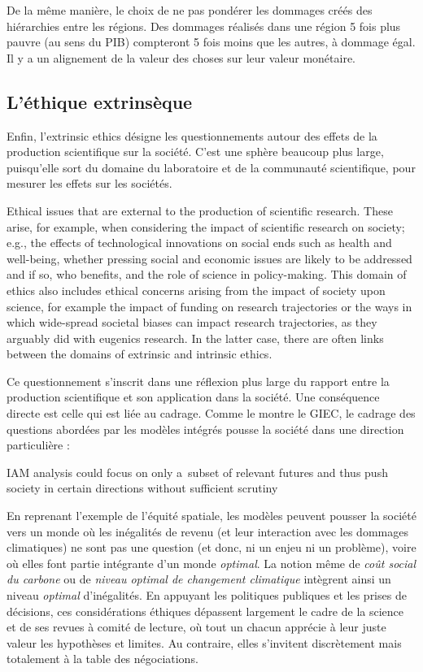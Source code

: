 De la même manière, le choix de ne pas pondérer les dommages créés des hiérarchies entre les régions. Des dommages réalisés dans une région 5 fois plus pauvre (au sens du PIB) compteront 5 fois moins que les autres, à dommage égal. Il y a un alignement de la valeur des choses sur leur valeur monétaire. 


\subsection{L'éthique extrinsèque}

Enfin, l'\Gls{extrinsic ethics} désigne les questionnements autour des effets de la production scientifique sur la société. C'est une sphère beaucoup plus large, puisqu'elle sort du domaine du laboratoire et de la communauté scientifique, pour mesurer les effets sur les sociétés. 

\begin{displayquote}
Ethical issues that are external to the production of scientific research. These arise, for example, when considering the impact of scientific research on society; e.g., the effects of technological innovations on social ends such as health and well-being, whether pressing social and economic issues are likely to be addressed and if so, who benefits, and the role of science in policy-making. This domain of ethics also includes ethical concerns arising from the impact of society upon science, for example the impact of funding on research trajectories or the ways in which wide-spread societal biases can impact research trajectories, as they arguably did with eugenics research. In the latter case, there are often links between the domains of extrinsic and intrinsic ethics.
\end{displayquote}
Ce questionnement s'inscrit dans une réflexion plus large du rapport entre la production scientifique et son application dans la société.  Une conséquence directe est celle qui est liée au cadrage. Comme le montre le GIEC, le cadrage des questions abordées par les modèles intégrés pousse la société dans une direction particulière : 

\begin{displayquote}
     IAM analysis could focus on only a subset of relevant futures and thus push society in certain directions without sufficient scrutiny 
\end{displayquote}
En reprenant l'exemple de l'équité spatiale, les modèles peuvent pousser la société vers un monde où les inégalités de revenu (et leur interaction avec les dommages climatiques) ne sont pas une question (et donc, ni un enjeu ni un problème), voire où elles font partie intégrante d'un monde \emph{optimal}. La notion même de \emph{coût social du carbone} ou de \emph{niveau optimal de changement climatique} intègrent ainsi un niveau \emph{optimal} d'inégalités. En appuyant les politiques publiques et les prises de décisions, ces considérations éthiques dépassent largement le cadre de la science et de ses revues à comité de lecture, où tout un chacun apprécie à leur juste valeur les hypothèses et limites. Au contraire, elles s'invitent discrètement mais totalement à la table des négociations. 

